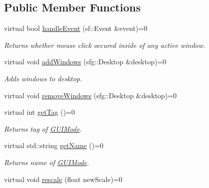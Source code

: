 \subsection*{Public Member Functions}
\begin{DoxyCompactItemize}
\item 
\hypertarget{classGUIMode_a00eae8004dac30abe03e6fd1e53fc849}{virtual bool \hyperlink{classGUIMode_a00eae8004dac30abe03e6fd1e53fc849}{handle\-Event} (sf\-::\-Event \&event)=0}\label{classGUIMode_a00eae8004dac30abe03e6fd1e53fc849}

\begin{DoxyCompactList}\small\item\em Returns whether mouse click occured inside of any active window. \end{DoxyCompactList}\item 
\hypertarget{classGUIMode_a1d1fec81001a6bf807760243d76de01c}{virtual void \hyperlink{classGUIMode_a1d1fec81001a6bf807760243d76de01c}{add\-Windows} (sfg\-::\-Desktop \&desktop)=0}\label{classGUIMode_a1d1fec81001a6bf807760243d76de01c}

\begin{DoxyCompactList}\small\item\em Adds windows to desktop. \end{DoxyCompactList}\item 
virtual void \hyperlink{classGUIMode_a7214583ea056553d7274cb3b8d8a1925}{remove\-Windows} (sfg\-::\-Desktop \&desktop)=0
\item 
\hypertarget{classGUIMode_ae96374e78394931314c1d36b61c4389c}{virtual int \hyperlink{classGUIMode_ae96374e78394931314c1d36b61c4389c}{get\-Tag} ()=0}\label{classGUIMode_ae96374e78394931314c1d36b61c4389c}

\begin{DoxyCompactList}\small\item\em Returns tag of \hyperlink{classGUIMode}{G\-U\-I\-Mode}. \end{DoxyCompactList}\item 
\hypertarget{classGUIMode_a0514db00b52d0d6f5d48b31bdbbac17c}{virtual std\-::string \hyperlink{classGUIMode_a0514db00b52d0d6f5d48b31bdbbac17c}{get\-Name} ()=0}\label{classGUIMode_a0514db00b52d0d6f5d48b31bdbbac17c}

\begin{DoxyCompactList}\small\item\em Returns name of \hyperlink{classGUIMode}{G\-U\-I\-Mode}. \end{DoxyCompactList}\item 
\hypertarget{classGUIMode_a240e8c9185c17e61280d4e698c2baf89}{virtual void \hyperlink{classGUIMode_a240e8c9185c17e61280d4e698c2baf89}{rescale} (float new\-Scale)=0}\label{classGUIMode_a240e8c9185c17e61280d4e698c2baf89}


\end{DoxyCompactItemize}
